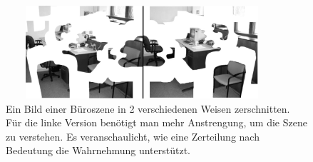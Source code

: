 \begin{figure}
	\centering
	\includegraphics[width=0.9\textwidth, height=130px]{pics/est.jpg}	
	\caption{Ein Bild einer Büroszene in 2 verschiedenen Weisen zerschnitten. Für die linke Version benötigt man mehr Anstrengung, um die Szene zu verstehen. Es veranschaulicht, wie eine Zerteilung nach Bedeutung die Wahrnehmung unterstützt. \cite{bib:est}}
	\label{img:est}
\end{figure}
